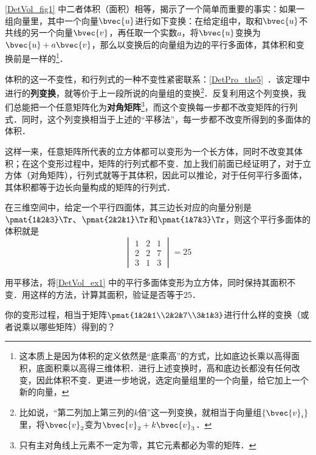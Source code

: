 \autoref{DetVol_fig1} 中二者体积（面积）相等，揭示了一个简单而重要的事实：如果一组向量里，其中一个向量$\bvec{u}$进行如下变换：在给定组中，取和$\bvec{u}$不共线的另一个向量$\bvec{v}$，再任取一个实数$a$，将$\bvec{u}$变换为$\bvec{u}+a\bvec{v}$，那么以变换后的向量组为边的平行多面体，其体积和变换前是一样的\footnote{这本质上是因为体积的定义依然是“底乘高”的方式，比如底边长乘以高得面积，底面积乘以高得三维体积．进行上述变换时，高和底边长都没有任何改变，因此体积不变．更进一步地说，选定向量组里的一个向量，给它加上一个新的向量，}．

体积的这一不变性，和行列式的一种不变性紧密联系：\autoref{DetPro_the5}~．该定理中进行的\textbf{列变换}，就等价于上一段所说的向量组的变换\footnote{比如说，“第二列加上第三列的$k$倍”这一列变换，就相当于向量组$\{\bvec{v}_i\}$里，将$\bvec{v}_2$变为$\bvec{v}_2+k\bvec{v}_3$．}．反复利用这个列变换，我们总能把一个任意矩阵化为\textbf{对角矩阵}\footnote{只有主对角线上元素不一定为零，其它元素都必为零的矩阵．}，而这个变换每一步都不改变矩阵的行列式．同时，这个列变换相当于上述的“平移法”，每一步都不改变所得到的多面体的体积．

这样一来，任意矩阵所代表的立方体都可以变形为一个长方体，同时不改变其体积；在这个变形过程中，矩阵的行列式都不变．加上我们前面已经证明了，对于立方体（对角矩阵），行列式就等于其体积，因此可以推论，对于任何平行多面体，其体积都等于边长向量构成的矩阵的行列式．

\begin{example}{}\label{DetVol_ex1}
在三维空间中，给定一个平行四面体，其三边长对应的向量分别是$\pmat{1&2&3}\Tr$、$\pmat{2&2&1}\Tr$和$\pmat{1&7&3}\Tr$，则这个平行多面体的体积就是
\begin{equation}
\begin{vmatrix}
1&2&1\\
2&2&7\\
3&1&3
\end{vmatrix} = 25
\end{equation}
\end{example}

\begin{exercise}{}
用平移法，将\autoref{DetVol_ex1} 中的平行多面体变形为立方体，同时保持其面积不变．用这样的方法，计算其面积，验证是否等于$25$．

你的变形过程，相当于矩阵$\pmat{1&2&1\\2&2&7\\3&1&3}$进行什么样的变换（或者说乘以哪些矩阵）得到的？
\end{exercise}






